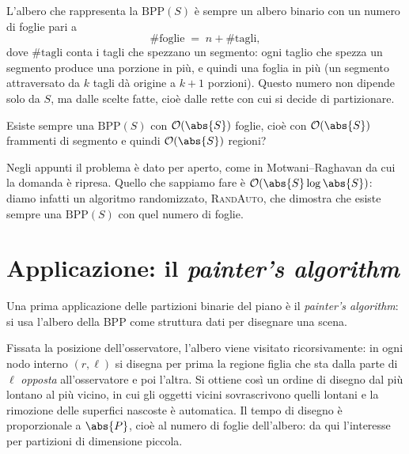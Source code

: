 \begin{osservazione}
L'albero che rappresenta la $\mathrm{BPP}(S)$ è sempre un albero binario con un numero di
foglie pari a
\[
  \#\text{foglie} \;=\; n + \#\text{tagli},
\]
dove $\#\text{tagli}$ conta i tagli che spezzano un segmento: ogni taglio che spezza un
segmento produce una porzione in più, e quindi una foglia in più (un segmento attraversato da
$k$ tagli dà origine a $k+1$ porzioni). Questo numero non dipende solo da $S$, ma dalle scelte
fatte, cioè dalle rette con cui si decide di partizionare.
\end{osservazione}

\begin{center}
\end{center}

\begin{domanda}
Esiste sempre una $\mathrm{BPP}(S)$ con $\Oh(\abs{S})$ foglie, cioè con $\Oh(\abs{S})$
frammenti di segmento e quindi $\Oh(\abs{S})$ regioni?
\end{domanda}

Negli appunti il problema è dato per aperto, come in Motwani--Raghavan da cui la domanda è
ripresa. Quello che sappiamo fare è $\Oh(\abs{S}\log\abs{S})$: diamo infatti un algoritmo
randomizzato, \textsc{RandAuto}, che dimostra che esiste sempre una $\mathrm{BPP}(S)$ con
quel numero di foglie.

\section{Applicazione: il \emph{painter's algorithm}}


Una prima applicazione delle partizioni binarie del piano è il \emph{painter's algorithm}:
si usa l'albero della BPP come struttura dati per disegnare una scena.

Fissata la posizione dell'osservatore, l'albero viene visitato ricorsivamente: in ogni nodo
interno $(r,\ell)$ si disegna per prima la regione figlia che sta dalla parte di $\ell$
\emph{opposta} all'osservatore e poi l'altra. Si ottiene così un ordine di disegno dal più
lontano al più vicino, in cui gli oggetti vicini sovrascrivono quelli lontani e la rimozione
delle superfici nascoste è automatica. Il tempo di disegno è proporzionale a $\abs{P}$, cioè
al numero di foglie dell'albero: da qui l'interesse per partizioni di dimensione piccola.

